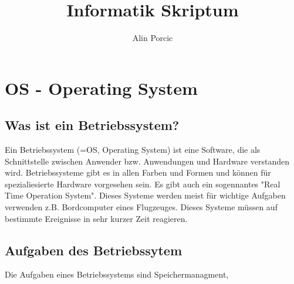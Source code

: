 \documentclass[a4paper,final]{report}
\title{Informatik Skriptum}
\author{Alin Porcic}
\begin{document}
\maketitle
\tableofcontents

\chapter{OS - Operating System}

\section{Was ist ein Betriebssystem?}

Ein Betriebssystem (=OS, Operating System) ist eine Software, die als Schnittstelle zwischen Anwender bzw. Anwendungen und Hardware verstanden wird.
Betriebssysteme gibt es in allen Farben und Formen und können für spezialiesierte Hardware vorgesehen sein. Es gibt auch ein sogennantes "Real Time
Operation System". Dieses Systeme werden meist für wichtige Aufgaben verwenden z.B. Bordcomputer eines Flugzeuges. Dieses Systeme müssen auf bestimmte
Ereignisse in sehr kurzer Zeit reagieren.


\section{Aufgaben des Betriebssytem}

Die Aufgaben eines Betriebssystems sind Speichermanagment,
\end{document}
